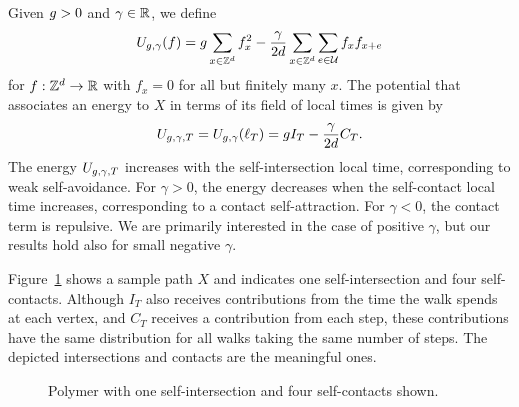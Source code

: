 Given $g > 0$ and $\gamma \in {\mathbb R}$,
we define
\begin{equation}
\label{e:Udef-neg}
U_{g,\gamma}(f)
=
g \sum_{x\in{ {{\mathbb Z}}^d }} f_x^2
- \frac{\gamma}{2d}
\sum_{x\in{ {{\mathbb Z}}^d }} \sum_{e\in\mathcal{U}} f_x f_{x+e}
\end{equation}
for $f:{ {{\mathbb Z}}^d }\rightarrow {\mathbb R}$ with $f_x = 0$
for all but finitely many $x$.
The potential that associates an energy to $X$ in terms of its
field of local times is given by
\begin{equation}
  \label{e:V}
  U_{g,\gamma,T}
  =
  U_{g,\gamma}(\ell_T)
  =
  g I_T
  - \frac{\gamma}{2d}
  C_T
  .
\end{equation}
The energy $U_{g,\gamma,T}$ increases with the self-intersection local time,
corresponding to weak self-avoidance.  For $\gamma >0$, the energy decreases
when the self-contact local time increases, corresponding to a contact self-attraction.
For $\gamma<0$, the contact term is repulsive.  We are primarily interested in
the case of positive $\gamma$, but our results hold also for small negative $\gamma$.

Figure~\ref{fig:polymer-contact} shows a sample path $X$
and indicates one self-intersection and four self-contacts.
Although $I_T$ also receives contributions from the
time the walk spends at each vertex, and $C_T$ receives a contribution from each step,
these contributions have the same distribution for all walks taking the same number
of steps.  The depicted intersections and contacts are the meaningful ones.

\begin{figure}[ht]
 \centering
 \caption{Polymer with one self-intersection and four self-contacts shown.}
 \label{fig:polymer-contact}
\end{figure}


